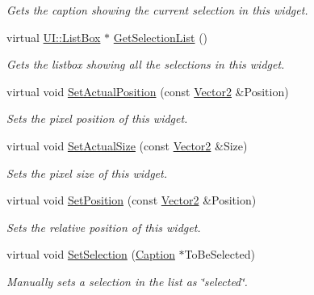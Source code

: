 \begin{DoxyCompactItemize}
\begin{DoxyCompactList}\small\item\em Gets the caption showing the current selection in this widget. \item\end{DoxyCompactList}\item 
virtual \hyperlink{classMezzanine_1_1UI_1_1ListBox}{UI::ListBox} $\ast$ \hyperlink{classMezzanine_1_1UI_1_1DropDownList_a5fe973285b5122fe0b74d0a81e8a26ca}{GetSelectionList} ()
\begin{DoxyCompactList}\small\item\em Gets the listbox showing all the selections in this widget. \item\end{DoxyCompactList}\item 
virtual void \hyperlink{classMezzanine_1_1UI_1_1DropDownList_ab038f951f09d18eaa2dad6c4eff01b7b}{SetActualPosition} (const \hyperlink{classMezzanine_1_1Vector2}{Vector2} \&Position)
\begin{DoxyCompactList}\small\item\em Sets the pixel position of this widget. \item\end{DoxyCompactList}\item 
virtual void \hyperlink{classMezzanine_1_1UI_1_1DropDownList_a83f213b851c8336c064398fe21cea202}{SetActualSize} (const \hyperlink{classMezzanine_1_1Vector2}{Vector2} \&Size)
\begin{DoxyCompactList}\small\item\em Sets the pixel size of this widget. \item\end{DoxyCompactList}\item 
virtual void \hyperlink{classMezzanine_1_1UI_1_1DropDownList_a480682783cfaf4ea18b90a058c958ea7}{SetPosition} (const \hyperlink{classMezzanine_1_1Vector2}{Vector2} \&Position)
\begin{DoxyCompactList}\small\item\em Sets the relative position of this widget. \item\end{DoxyCompactList}\item 
virtual void \hyperlink{classMezzanine_1_1UI_1_1DropDownList_aaeb03cbcb2e5a3c5bde4d4f513d70ed8}{SetSelection} (\hyperlink{classMezzanine_1_1UI_1_1Caption}{Caption} $\ast$ToBeSelected)
\begin{DoxyCompactList}\small\item\em Manually sets a selection in the list as \char`\"{}selected\char`\"{}. \item\end{DoxyCompactList}\item 

\end{DoxyCompactItemize}

